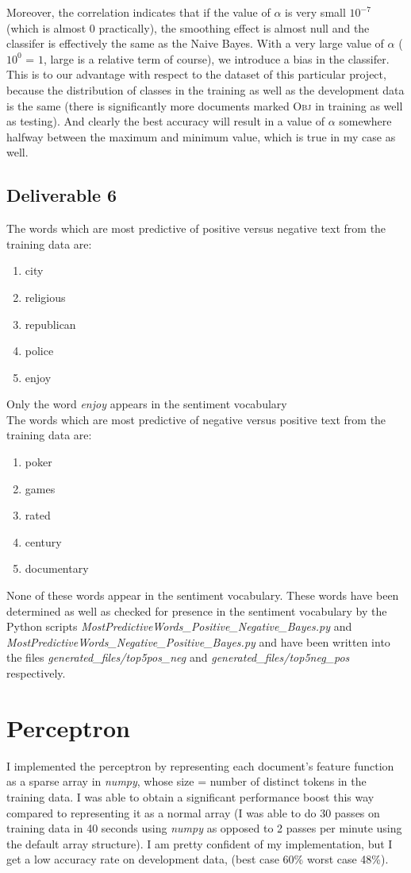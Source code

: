 \documentclass[10pt, letter]{article}
\begin{document}
Moreover, the correlation indicates that if the value of $\alpha$ is very small $10^{-7}$ (which is almost 0 practically), the smoothing effect is almost null and the classifer is effectively the same as the Naive Bayes. With a very large value of $\alpha$ ($10^0$ = $1$, large is a relative term of course), we introduce a bias in the classifer. This is to our advantage with respect to the dataset of this particular project, because the distribution of classes in the training as well as the development data is the same (there is significantly more documents marked \textsc{Obj} in training as well as testing). And clearly the best accuracy will result in a value of $\alpha$ somewhere halfway between the maximum and minimum value, which is true in my case as well.

\subsection*{Deliverable 6}
The words which are most predictive of positive versus negative text from the training data are:
\begin{enumerate}
	\item city
	\item religious	
	\item republican	
	\item police
	\item enjoy
\end{enumerate}
Only the word \textit{enjoy} appears in the sentiment vocabulary\\
The words which are most predictive of negative versus positive text from the training data are:
\begin{enumerate}
	\item poker
	\item games	
	\item rated	
	\item century
	\item documentary
\end{enumerate}
None of these words appear in the sentiment vocabulary. These words have been determined as well as checked for presence in the sentiment vocabulary by the Python scripts \textit{MostPredictiveWords\_Positive\_Negative\_Bayes.py} and \textit{MostPredictiveWords\_Negative\_Positive\_Bayes.py} and have been written into the files \textit{generated\_files/top5pos\_neg} and \textit{generated\_files/top5neg\_pos} respectively.

\section{Perceptron}
I implemented the perceptron by representing each document's feature function as a sparse array in \textit{numpy}, whose size = number of distinct tokens in the training data. I was able to obtain a significant performance boost this way compared to representing it as a normal array (I was able to do 30 passes on training data in 40 seconds using \textit{numpy} as opposed to 2 passes per minute using the default array structure). I am pretty confident of my implementation, but I get a low accuracy rate on development data, (best case 60\% worst case 48\%).
\end{document}
